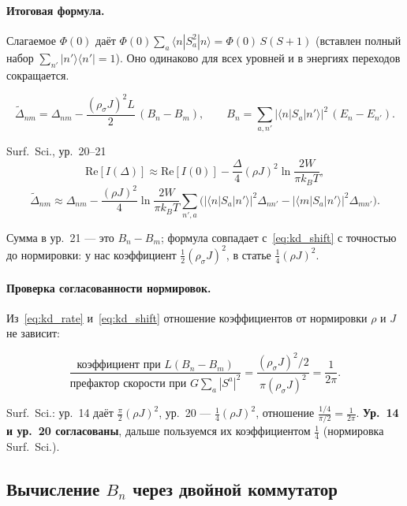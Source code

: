 \paragraph{Итоговая формула.} Слагаемое $\Phi(0)$ даёт
$\Phi(0)\sum_a\langle n|S_a^2|n\rangle=\Phi(0)\,S(S+1)$ (вставлен полный набор
$\sum_{n'}|n'\rangle\langle n'|=1$). Оно одинаково для всех уровней и в энергиях переходов
сокращается.
\begin{resbox}
\begin{equation}
\tilde\Delta_{nm}=\Delta_{nm}-\frac{(\rho_\sigma J)^2L}{2}\,(B_n-B_m),\qquad
B_n=\sum_{a,n'}|\langle n|S_a|n'\rangle|^2\,(E_n-E_{n'}) .
\label{eq:kd_shift}
\end{equation}
\end{resbox}
\begin{paperbox}{Surf.\ Sci., ур.~20--21}
\[
\mathrm{Re}[I(\Delta)]\approx\mathrm{Re}[I(0)]-\frac\Delta4(\rho J)^2\ln\frac{2W}{\pi k_BT},
\]
\[
\tilde\Delta_{nm}\approx\Delta_{nm}-\frac{(\rho J)^2}{4}\ln\frac{2W}{\pi k_BT}
\sum_{n',a}\Big(|\langle n|S_a|n'\rangle|^2\Delta_{nn'}-|\langle m|S_a|n'\rangle|^2\Delta_{mn'}\Big).
\]
\end{paperbox}
\begin{cmpbox}
Сумма в ур.~21 --- это $B_n-B_m$; формула совпадает с~\eqref{eq:kd_shift} с
точностью до нормировки: у нас коэффициент $\tfrac12(\rho_\sigma J)^2$, в статье
$\tfrac14(\rho J)^2$.
\end{cmpbox}

\paragraph{Проверка согласованности нормировок.} Из~\eqref{eq:kd_rate}
и~\eqref{eq:kd_shift} отношение коэффициентов от нормировки $\rho$ и $J$ не зависит:
\begin{resbox}
\[
\frac{\text{коэффициент при } L(B_n-B_m)}{\text{префактор скорости при } G\sum_a|S^a|^2}
=\frac{(\rho_\sigma J)^2/2}{\pi(\rho_\sigma J)^2}=\frac{1}{2\pi}.
\]
\end{resbox}
\begin{cmpbox}
Surf.\ Sci.: ур.~14 даёт $\tfrac\pi2(\rho J)^2$, ур.~20 --- $\tfrac14(\rho J)^2$, отношение
$\tfrac{1/4}{\pi/2}=\tfrac1{2\pi}$. \textbf{Ур.~14 и ур.~20 согласованы}, дальше пользуемся
их коэффициентом $\tfrac14$ (нормировка Surf.\ Sci.).
\end{cmpbox}

\subsection{Вычисление $B_n$ через двойной коммутатор}
\label{sec:kd_Bn}

